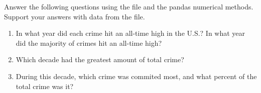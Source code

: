 \begin{problem}
Answer the following questions using the file  and the pandas numerical methods.
Support your answers with data from the file.

\begin{enumerate}
	\item In what year did each crime hit an all-time high in the U.S.? In what year did the majority of crimes hit an all-time high?
	\item Which decade had the greatest amount of total crime?
	\item During this decade, which crime was commited most, and what percent of the total crime was it?
\end{enumerate}
\end{problem}

\begin{comment}
\begin{info}
The \li{Series} in Problem \ref{prob:pandas-random-walk} is an example of a \emph{time series}, since it is indexed by time.
Time series show up often in data science; we will explore them in more depth in another lab.
\end{info}
\end{comment}



